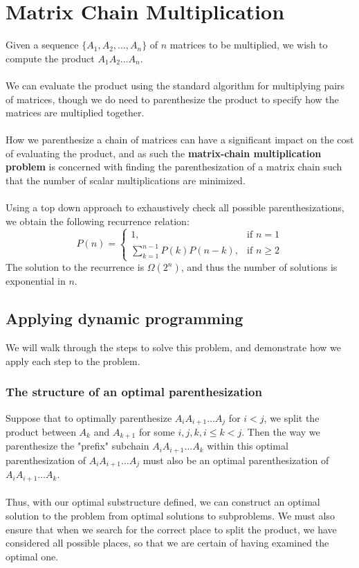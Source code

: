 \documentclass[a4paper]{article}
\begin{document}
\section{Matrix Chain Multiplication}
Given a sequence $\{A_1, A_2, \dots, A_n\}$ of $n$ matrices to be multiplied, we wish to compute the product $A_1A_2\dots A_n$.\\ \\
We can evaluate the product using the standard algorithm for multiplying pairs of matrices, though we do need to parenthesize the product to specify how the matrices are multiplied together.\\ \\
How we parenthesize a chain of matrices can have a significant impact on the cost of evaluating the product, and as such the \textbf{matrix-chain multiplication problem} is concerned with finding the parenthesization of a matrix chain such that the number of scalar multiplications are minimized.\\ \\
Using a top down approach to exhaustively check all possible parenthesizations, we obtain the following recurrence relation:
\[
P(n)=
	\begin{cases}
	1, & \text{if } n=1\\
	\sum\limits_{k=1}^{n-1}P(k)P(n-k), & \text{if } n \ge 2
	\end{cases}
\]
The solution to the recurrence is $\Omega(2^n)$, and thus the number of solutions is exponential in $n$.

\subsection{Applying dynamic programming}
We will walk through the steps to solve this problem, and demonstrate how we apply each step to the problem.
\subsubsection{The structure of an optimal parenthesization}
Suppose that to optimally parenthesize $A_iA_{i+1}\dots A_j$ for $i < j$, we split the product between $A_k$ and $A_{k+1}$ for some $i, j, k, i\le k < j$. Then the way we parenthesize the "prefix" subchain $A_iA_{i+1}\dots A_k$ within this optimal parenthesization of $A_iA_{i+1}\dots A_j$ must also be an optimal parenthesization of $A_i A_{i+1} \dots A_k$.\\ \\
Thus, with our optimal substructure defined, we can construct an optimal solution to the problem from optimal solutions to subproblems. We must also ensure that when we search for the correct place to split the product, we have considered all possible places, so that we are certain of having examined the optimal one.
\end{document}
